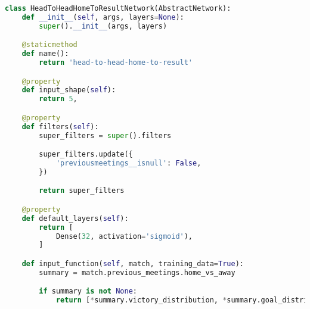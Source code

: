 \begin{lstlisting}[language=Python,caption={The head-to-head-home-to-result network class.},label={lst:head-to-head-example}]
class HeadToHeadHomeToResultNetwork(AbstractNetwork):
    def __init__(self, args, layers=None):
        super().__init__(args, layers)

    @staticmethod
    def name():
        return 'head-to-head-home-to-result'

    @property
    def input_shape(self):
        return 5,

    @property
    def filters(self):
        super_filters = super().filters

        super_filters.update({
            'previousmeetings__isnull': False,
        })

        return super_filters

    @property
    def default_layers(self):
        return [
            Dense(32, activation='sigmoid'),
        ]

    def input_function(self, match, training_data=True):
        summary = match.previous_meetings.home_vs_away

        if summary is not None:
            return [*summary.victory_distribution, *summary.goal_distribution], match.final_result
\end{lstlisting}